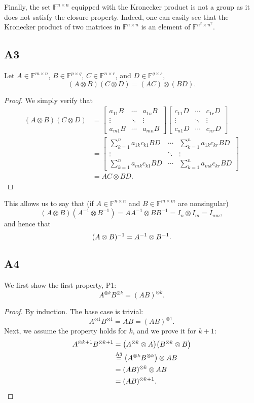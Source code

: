 \documentclass[11pt]{article}
\newcommand{\field}{\mathbb{F}} %
\newcommand{\kp}{\otimes} %
\begin{document}
Finally, the set \(\field^{n \times n}\) equipped with the Kronecker product is not a group as it does not satisfy the closure property. Indeed, one can easily see that the Kronecker product of two matrices in \(\field^{n \times n}\) is an element of \(\field^{n^2 \times n^2}\).

\subsection*{A3}
Let \(A \in \field^{m \times n}\), \(B \in \field^{p \times q}\), \(C \in \field^{n \times r}\), and \(D \in \field^{q \times s}\),
\begin{equation*}
(A \kp B) (C \kp D)=(AC)\kp (BD).
\end{equation*}
\begin{proof}
We simply verify that
\begin{align*}
(A \kp B) (C \kp D) &= \begin{bmatrix}
a_{11} B & \cdots & a_{1n}B \\
\vdots & \ddots & \vdots \\
a_{m1} B & \cdots & a_{mn} B
\end{bmatrix} \begin{bmatrix}
c_{11} D & \cdots & c_{1r} D \\
\vdots & \ddots & \vdots \\
c_{n1} D & \cdots & c_{nr} D
\end{bmatrix}\\
&= \begin{bmatrix}
\sum_{k=1}^n a_{1k} c_{k1} BD & \cdots & \sum_{k=1}^n a_{1k} c_{kr} BD \\
\vdots & \ddots & \vdots \\
\sum_{k=1}^n a_{mk} c_{k1} BD & \cdots & \sum_{k=1}^n a_{mk} c_{kr} BD
\end{bmatrix}\\
&= AC \kp BD.
\end{align*}
\end{proof}

This allows us to say that (if \(A \in \field^{n \times n}\) and \(B \in \field^{m \times m}\) are nonsingular)
\[
(A \kp B)(A^{-1} \kp B^{-1}) = AA^{-1} \kp BB^{-1} = I_n \kp I_m = I_{nm},
\]
and hence that
\[
(A \kp B)^{-1} = A^{-1} \kp B^{-1}.\qedhere
\]

\subsection*{A4}
We first show the first property, P1:
\[
A^{\kp k} B^{\kp k} = (AB)^{\kp k}.
\]
\begin{proof}
By induction.
The base case is trivial:
\[
A^{\kp 1} B^{\kp 1} = AB = (AB)^{\kp 1}.
\]
Next, we assume the property holds for $k$, and we prove it for $k+1$:
\begin{align*}
A^{\kp k+1} B^{\kp k+1} &= \big(A^{\kp k} \kp A\big) \big(B^{\kp k} \kp B\big)\\
&\overset{\textnormal{A3}}{=}\big(A^{\kp k} B^{\kp k}\big) \kp AB\\
&= (AB)^{\kp k} \kp AB\\
&= (AB)^{\kp k+1}.\qedhere
\end{align*}
\end{proof}
\end{document}
